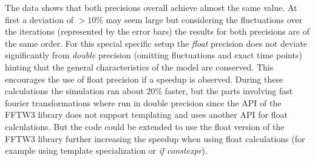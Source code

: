 \documentclass[master.tex]{subfiles}
\begin{document}
The data shows that both precisions overall achieve almost the same value. At first a deviation of $>10\%$ may seem large but considering the fluctuations over the iterations (represented by the error bars) the results for both precisions are of the same order. For this special specific setup the \textit{float} precision does not deviate significantly from \textit{double} precision (omitting fluctuations and exact time points) hinting that the general characteristics of the model are conserved. This encourages the use of float precision if a speedup is observed. During these calculations the simulation ran about 20\% faster, but the parts involving fast fourier transformations where run in double precision since the API of the FFTW3 library does not support templating and uses another API for float calculations. But the code could be extended to use the float version of the FFTW3 library further increasing the speedup when using float calculations (for example using template specialization or \textit{if constexpr}). 
\end{document}
